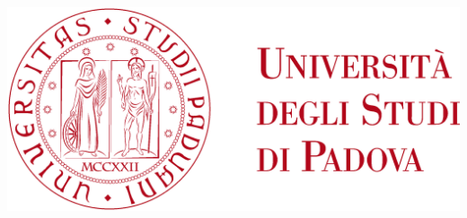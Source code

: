 \begin{titlepage}
\begin{center}
		\includegraphics[scale = 0.055]{../latex/images/loghi/logo-unipd.png}

	\end{center}
\end{titlepage}
